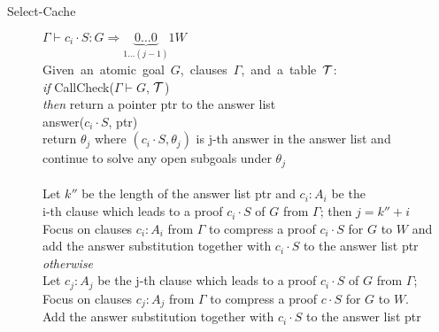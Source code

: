 \documentclass{llncs}
\newcommand{\fighead}{\hrule\vspace{1.5ex}}
\newcommand{\vd}{\vdash}
\begin{document}
\begin{center}
\begin{small}
\begin{description}
\item[Select-Cache] $\Gamma \vd c_i \cdot S: G \Rightarrow
  \underset{1 \ldots (j-1)}{\underbrace{0\ldots 0}}1W $ \\
    \mbox{Given an atomic goal $G$, clauses $\Gamma$, and a table $\cal{T}$:}\hfill
\\
    {\em{if}} CallCheck($\Gamma \vd G$, $\cal{T}$) \\
         {\em{then}} return a pointer ptr to the answer list\\
         answer($c_i \cdot S$, ptr) \\
         return $\theta_j$ where $(c_i \cdot S,
        \theta_j)$ is j-th answer in the answer list and \\
        \hspace{1.5cm}continue to solve any open subgoals under
         $\theta_j$ \\
         \hspace{0.75cm}{\em otherwise}\\
         \hspace{1cm}Let  $k''$ be the length of the answer list ptr
         and $c_i : A_i$  be the\\
         \hspace{1cm} i-th clause which leads to a
         proof $c_i\cdot S$ of $G$ from 
         $\Gamma$; then $j = k'' + i$\\
         \hspace{1cm}Focus on clauses $c_i : A_i$ from $\Gamma$ to compress 
         a proof $c_i\cdot S$ for $G$ to $W$ and \\
         \hspace{1cm}add the answer substitution together with
         $c_i\cdot S$ to the answer list ptr\\ 
      {\em otherwise} \\
\hspace{0.5cm}Let  $c_j : A_j$ be the j-th clause which leads to a 
         proof $c_i\cdot S$ of $G$ from $\Gamma$;\\
\hspace{0.5cm}Focus on clauses $c_j : A_j$ from $\Gamma$ to compress 
a proof $c\cdot S$ for $G$ to $W$.\\
     \hspace{0.5cm}Add the answer substitution together with
         $c_i\cdot S$ to the answer list ptr\\[1em]


\end{description}
\end{small}
\end{center}
\end{document}
